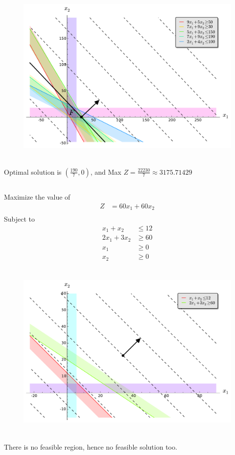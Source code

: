 \documentclass[12pt]{article}
\begin{document}
  \begin{figure}[H]
    \centering
\includegraphics[height=3.5in]{./images/p3_2.pdf}
\end{figure}
Optimal solution is $\left(\frac{190}{7}, 0\right)$, and Max $Z=\frac{22230}{7}\approx 3175.71429$

\newpage
\subsection{}

Maximize the value of
\begin{align*}
Z           & = 60 x_1 + 60 x_2 \\
\end{align*}
Subject to 
\begin{align*}
x_1+x_2     & \le 12            \\
2 x_1+3 x_2 & \ge 60            \\
 x_1        & \ge 0             \\
 x_2        & \ge 0  
\end{align*}

  \begin{figure}[H]
    \centering
\includegraphics[height=3.5in]{./images/p3_3.pdf}
\end{figure}
There is no feasible region, hence no feasible solution too.
\end{document}
